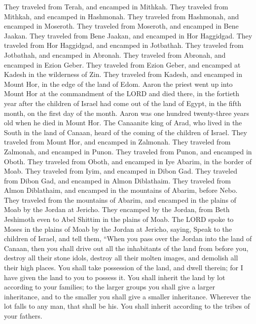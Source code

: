 \myverse{}They traveled from Terah, and encamped in Mithkah.
\myverse{}They traveled from Mithkah, and encamped in Hashmonah.
\myverse{}They traveled from Hashmonah, and encamped in Moseroth.
\myverse{}They traveled from Moseroth, and encamped in Bene Jaakan.
\myverse{}They traveled from Bene Jaakan, and encamped in Hor Haggidgad.
\myverse{}They traveled from Hor Haggidgad, and encamped in Jotbathah.
\myverse{}They traveled from Jotbathah, and encamped in Abronah.
\myverse{}They traveled from Abronah, and encamped in Ezion Geber.
\myverse{}They traveled from Ezion Geber, and encamped at Kadesh in the wilderness
of Zin.
\myverse{}They traveled from Kadesh, and encamped in Mount Hor, in the edge of the
land of Edom.
\myverse{}Aaron the priest went up into Mount Hor at the commandment of the LORD and
died there, in the fortieth year after the children of Israel had come out of the land of Egypt, in the
fifth month, on the first day of the month.
\myverse{}Aaron was one hundred twenty-three years old when he died in Mount Hor.
\myverse{}The Canaanite king of Arad, who lived in the South in the land of Canaan,
heard of the coming of the children of Israel.
\myverse{}They traveled from Mount Hor, and encamped in Zalmonah.
\myverse{}They traveled from Zalmonah, and encamped in Punon.
\myverse{}They traveled from Punon, and encamped in Oboth.
\myverse{}They traveled from Oboth, and encamped in Iye Abarim, in the border of Moab.
\myverse{}They traveled from Iyim, and encamped in Dibon Gad.
\myverse{}They traveled from Dibon Gad, and encamped in Almon Diblathaim.
\myverse{}They traveled from Almon Diblathaim, and encamped in the mountains of Abarim,
before Nebo.
\myverse{}They traveled from the mountains of Abarim, and encamped in the plains of
Moab by the Jordan at Jericho.
\myverse{}They encamped by the Jordan, from Beth Jeshimoth even to Abel Shittim in
the plains of Moab.
\myverse{}The LORD spoke to Moses in the plains of Moab by the Jordan at Jericho, saying,
\myverse{}Speak to the children of Israel, and tell them, “When you pass over the Jordan
into the land of Canaan,
\myverse{}then you shall drive out all the inhabitants of the land from before you,
destroy all their stone idols, destroy all their molten images, and demolish all their high places.
\myverse{}You shall take possession of the land, and dwell therein; for I have given
the land to you to possess it.
\myverse{}You shall inherit the land by lot according to your families; to the larger
groups you shall give a larger inheritance, and to the smaller you shall give a smaller inheritance. Wherever
the lot falls to any man, that shall be his. You shall inherit according to the tribes of your fathers.


